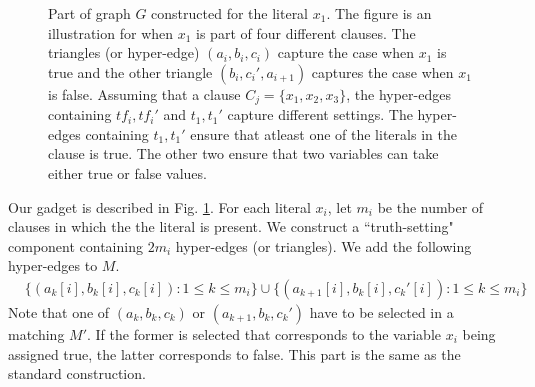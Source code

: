 \documentclass[12pt]{article}
\begin{document}
\begin{figure}[!ht]
  	\caption{Part of graph $G$ constructed for the literal $x_1$. The figure is an illustration for when $x_1$ is part of four different clauses. The triangles (or hyper-edge) $(a_i, b_i, c_i)$ capture the case when $x_1$ is true and the other triangle $(b_i, c_i', a_{i+1})$ captures the case when $x_1$ is false. Assuming that a clause $C_j = \{x_1, x_2, x_3\}$, the hyper-edges containing $tf_i, tf_i'$ and $t_1, t_1'$ capture different settings. The hyper-edges containing $t_1, t_1'$ ensure that atleast one of the literals in the clause is true. The other two ensure that two variables can take either true or false values.}
\label{fig:3DMQueries}
\end{figure}

Our gadget is described in Fig. \ref{fig:3DMQueries}. For each literal $x_i$, let $m_i$ be the number of clauses in which the the literal is present. We construct a ``truth-setting" component containing $2m_i$ hyper-edges (or triangles). We add the following hyper-edges to $M$.
\begin{align*}
  &\{(a_k[i], b_k[i], c_k[i]): 1 \le k \le m_i\} \cup \{(a_{k+1}[i], b_k[i], c_k'[i]): 1 \le k \le m_i\}
\end{align*}
Note that one of $(a_k, b_k, c_k)$ or $(a_{k+1}, b_k, c_k')$ have to be selected in a matching $M'$. If the former is selected that corresponds to the variable $x_i$ being assigned true, the latter corresponds to false. This part is the same as the standard construction. 
\end{document}
